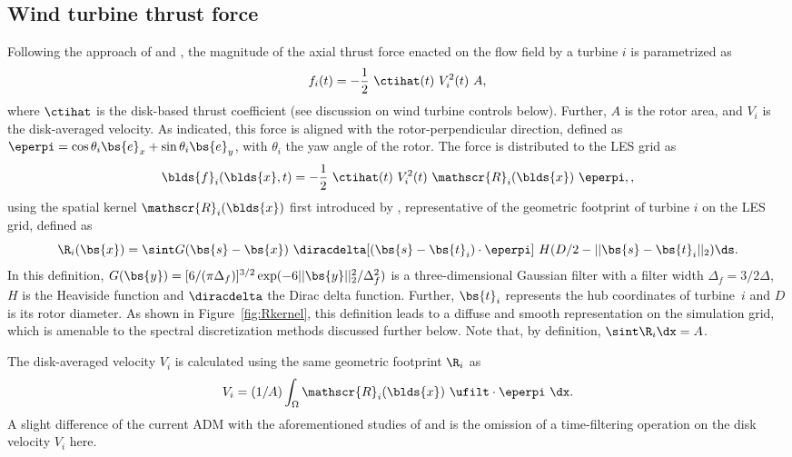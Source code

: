 \subsection{Wind turbine thrust force}
Following the approach of \cite{meyers2010large} and \cite{calaf2010large}, the magnitude of the axial thrust force enacted on the flow field by a turbine $i$ is parametrized as 
\begin{equation}
f_i(t) = - \frac{1}{2}~\ctihat(t)~V_{i}^2(t)~A,
\end{equation}
where $\ctihat$ is the disk-based thrust coefficient (see discussion on wind turbine controls below). Further, $A$ is the rotor area, and $V_i$ is the disk-averaged velocity. As indicated, this force is aligned with the rotor-perpendicular direction, defined as $\eperpi =  \cos \theta_i \bs{e}_x + \sin \theta_i \bs{e}_y $, with $\theta_i$ the yaw angle of the rotor. The force is distributed to the LES grid as 
\begin{equation}
\blds{f}_i(\blds{x},t) = - \frac{1}{2}~\ctihat(t)~V_{i}^2(t)~\mathscr{R}_i(\blds{x})~\eperpi,\label{eq:define_force}, 
\end{equation}
using the spatial kernel $\mathscr{R}_i (\blds{x})$ first introduced by \cite{meyers2010large}, representative of the geometric footprint of turbine $i$ on the LES grid, defined as 
\begin{equation}
\R_i(\bs{x}) = \sint G(\bs{s}-\bs{x}) ~ \diracdelta [(\bs{s}-\bs{t}_i)\cdot\eperpi] ~ H(D/2-\vert\vert \bs{s}-\bs{t}_i\vert\vert_2) \ds \label{eq:R}.
\end{equation} 
In this definition, $G(\bs{y}) = [6/(\pi \Delta_f)]^{3/2} \exp(-6\vert\vert \bs{y}\vert\vert_2^2/\Delta_f^2)$ is a three-dimensional Gaussian filter with a filter width $\Delta_f = 3/2\Delta$, $H$ is the Heaviside function and $\diracdelta$ the Dirac delta function. Further, $\bs{t}_i$ represents the hub coordinates of turbine~$i$ and $D$ is its rotor diameter. As shown in Figure~\ref{fig:Rkernel}, this definition leads to a diffuse and smooth representation on the simulation grid, which is amenable to the spectral discretization methods discussed further below. Note that, by definition, $\sint \R_i \dx = A$.

The disk-averaged velocity $V_i$ is calculated using the same geometric footprint $\R_i$ as 
\begin{equation}
V_{i} = (1/A) \int_\Omega \mathscr{R}_i(\blds{x})\ \ufilt \cdot \eperpi \ \dx.
\end{equation} 
A slight difference of the current ADM with the aforementioned studies of \cite{meyers2010large} and \cite{calaf2010large} is the omission of a time-filtering operation on the disk velocity $V_i$ here. 

